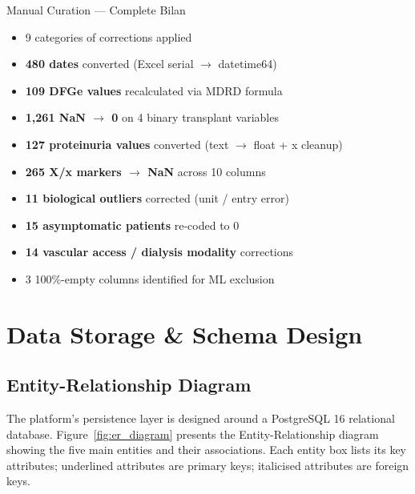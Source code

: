 \documentclass[12pt,a4paper,twoside]{report}
\begin{document}
\begin{resultbox}{Manual Curation — Complete Bilan}
\begin{itemize}[noitemsep]
  \item 9 categories of corrections applied
  \item \textbf{480 dates} converted (Excel serial $\rightarrow$ datetime64)
  \item \textbf{109 DFGe values} recalculated via MDRD formula
  \item \textbf{1,261 NaN $\rightarrow$ 0} on 4 binary transplant variables
  \item \textbf{127 proteinuria values} converted (text $\rightarrow$ float + x cleanup)
  \item \textbf{265 X/x markers $\rightarrow$ NaN} across 10 columns
  \item \textbf{11 biological outliers} corrected (unit / entry error)
  \item \textbf{15 asymptomatic patients} re-coded to 0
  \item \textbf{14 vascular access / dialysis modality} corrections
  \item 3 100\%-empty columns identified for ML exclusion
\end{itemize}
\end{resultbox}


\section{Data Storage \& Schema Design}\label{sec:storage}

\subsection{Entity-Relationship Diagram}

The platform's persistence layer is designed around a PostgreSQL 16 relational database. Figure~\ref{fig:er_diagram} presents the Entity-Relationship diagram showing the five main entities and their associations. Each entity box lists its key attributes; underlined attributes are primary keys; italicised attributes are foreign keys.
\end{document}

